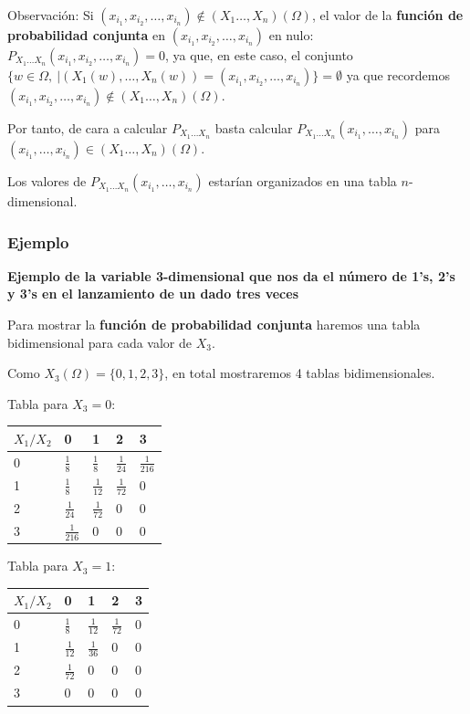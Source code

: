\documentclass[]{book}
\begin{document}
Observación:
Si \((x_{i_1},x_{i_2},\ldots,x_{i_n})\not\in (X_1\ldots,X_n)(\Omega)\), el valor de la \textbf{función de probabilidad conjunta} en \((x_{i_1},x_{i_2},\ldots,x_{i_n})\) en nulo: \(P_{X_1\ldots X_n}(x_{i_1},x_{i_2},\ldots,x_{i_n})=0\), ya que, en este caso, el conjunto \(\{w\in\Omega,\ | (X_1(w),\ldots,X_n(w))=(x_{i_1},x_{i_2},\ldots,x_{i_n})\}=\emptyset\) ya que recordemos \((x_{i_1},x_{i_2},\ldots,x_{i_n})\not\in (X_1\ldots,X_n)(\Omega)\).

Por tanto, de cara a calcular \(P_{X_1\ldots X_n}\) basta calcular \(P_{X_1\ldots X_n}(x_{i_1},\ldots,x_{i_n})\) para \((x_{i_1},\ldots,x_{i_n})\in (X_1\ldots,X_n)(\Omega)\).

Los valores de \(P_{X_1\ldots X_n}(x_{i_1},\ldots,x_{i_n})\) estarían organizados en una tabla \(n\)-dimensional.

\hypertarget{ejemplo-3}{%
\subsubsection{Ejemplo}\label{ejemplo-3}}

\textbf{Ejemplo de la variable 3-dimensional que nos da el número de 1's, 2's y 3's en el lanzamiento de un dado tres veces}

Para mostrar la \textbf{función de probabilidad conjunta} haremos una tabla bidimensional para cada valor de \(X_3\).

Como \(X_3(\Omega)=\{0,1,2,3\}\), en total mostraremos 4 tablas bidimensionales.

Tabla para \(X_3=0\):

\begin{longtable}[]{@{}lllll@{}}
\toprule
\(X_1/X_2\) & 0 & 1 & 2 & 3\tabularnewline
\midrule
\endhead
0 & \(\frac{1}{8}\) & \(\frac{1}{8}\) & \(\frac{1}{24}\) & \(\frac{1}{216}\)\tabularnewline
1 & \(\frac{1}{8}\) & \(\frac{1}{12}\) & \(\frac{1}{72}\) & \(0\)\tabularnewline
2 & \(\frac{1}{24}\) & \(\frac{1}{72}\) & \(0\) & \(0\)\tabularnewline
3 & \(\frac{1}{216}\) & \(0\) & \(0\) & \(0\)\tabularnewline
\bottomrule
\end{longtable}

Tabla para \(X_3=1\):

\begin{longtable}[]{@{}lllll@{}}
\toprule
\(X_1/X_2\) & 0 & 1 & 2 & 3\tabularnewline
\midrule
\endhead
0 & \(\frac{1}{8}\) & \(\frac{1}{12}\) & \(\frac{1}{72}\) & \(0\)\tabularnewline
1 & \(\frac{1}{12}\) & \(\frac{1}{36}\) & \(0\) & \(0\)\tabularnewline
2 & \(\frac{1}{72}\) & \(0\) & \(0\) & \(0\)\tabularnewline
3 & \(0\) & \(0\) & \(0\) & \(0\)\tabularnewline
\bottomrule
\end{longtable}
\end{document}
